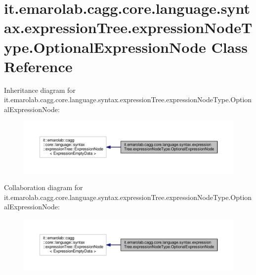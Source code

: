 \hypertarget{classit_1_1emarolab_1_1cagg_1_1core_1_1language_1_1syntax_1_1expressionTree_1_1expressionNodeType_1_1OptionalExpressionNode}{\section{it.\-emarolab.\-cagg.\-core.\-language.\-syntax.\-expression\-Tree.\-expression\-Node\-Type.\-Optional\-Expression\-Node Class Reference}
\label{classit_1_1emarolab_1_1cagg_1_1core_1_1language_1_1syntax_1_1expressionTree_1_1expressionNodeType_1_1OptionalExpressionNode}
}


Inheritance diagram for it.\-emarolab.\-cagg.\-core.\-language.\-syntax.\-expression\-Tree.\-expression\-Node\-Type.\-Optional\-Expression\-Node\-:\nopagebreak
\begin{figure}[H]
\begin{center}
\leavevmode
\includegraphics[width=350pt]{classit_1_1emarolab_1_1cagg_1_1core_1_1language_1_1syntax_1_1expressionTree_1_1expressionNodeTypb9b8767f2422258971ea12ce93f0e698}
\end{center}
\end{figure}


Collaboration diagram for it.\-emarolab.\-cagg.\-core.\-language.\-syntax.\-expression\-Tree.\-expression\-Node\-Type.\-Optional\-Expression\-Node\-:\nopagebreak
\begin{figure}[H]
\begin{center}
\leavevmode
\includegraphics[width=350pt]{classit_1_1emarolab_1_1cagg_1_1core_1_1language_1_1syntax_1_1expressionTree_1_1expressionNodeTypc3c45c91767e50fb8e59390344a7843d}
\end{center}
\end{figure}
